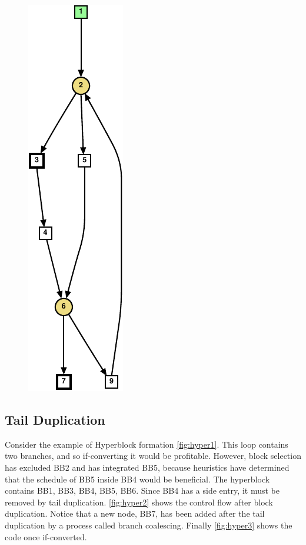\begin{figure}
{    \includegraphics[scale=0.6]{graph7}
    \label{fig:wc2}}
\label{fig:wc example}
\end{figure}

\subsection{Tail Duplication}

Consider the example of Hyperblock formation \ref{fig:hyper1}. This loop contains two branches, and so if-converting it would be profitable. However, block selection has excluded BB2 and has integrated BB5, because heuristics have determined that the schedule of BB5 inside BB4 would be beneficial. The hyperblock contains {BB1, BB3, BB4, BB5, BB6}. Since BB4 has a side entry, it must be removed by tail duplication. \ref{fig:hyper2} shows the control flow after block duplication. Notice that a new node, BB7, has been added after the tail duplication by a process called branch coalescing. Finally \ref{fig:hyper3} shows the code once if-converted.

